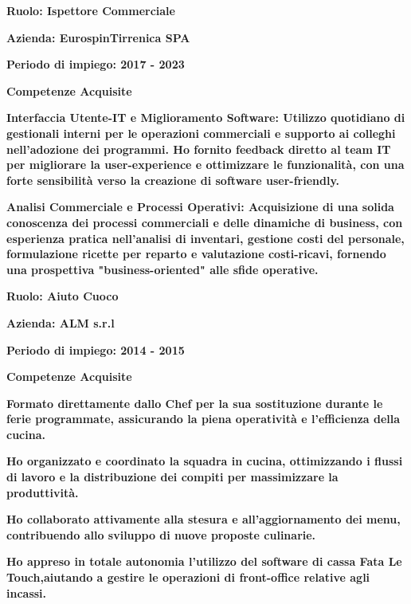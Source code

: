 \documentclass{article}
\newenvironment{listaIdentazione}[1]{
			\begin{list}{}{
			  \setlength{\leftmargin}{#1} %
			  \setlength{\itemsep}{0pt}	%
			  \setlength{\parskip}{0pt} %
			  \setlength{\parsep}{0pt} %
			  \setlength{\labelwidth}{0pt} %
			  \setlength{\labelsep}{0pt} %
			  \renewcommand{\makelabel}[1]{} %
			  }
			}{\end{list}}
\newcommand{\spaziocorto}{\\[0.1cm]}
\newcommand{\spaziolungo}{\\[0.3cm]}
\newcommand{\spaziopiulungo}{\\[0.8cm]}
\begin{document}
\begin{flushleft}
		\textbf{\normalsize{Ruolo: Ispettore Commerciale}}
			\spaziocorto
			\begin{listaIdentazione}{0.5cm}
			\item {\textbf{\normalsize{Azienda: EurospinTirrenica SPA }}}
			\spaziocorto
			\item {\textbf{\normalsize{Periodo di impiego: 2017 - 2023}}}
			\spaziocorto
			\item {\textbf{\normalsize{Competenze Acquisite}}}
			\spaziolungo
			\item {\textbf{\normalsize{Interfaccia Utente-IT e Miglioramento Software:
			Utilizzo quotidiano di gestionali interni per le operazioni commerciali e
			supporto ai colleghi nell'adozione dei programmi. Ho fornito feedback diretto
			al team IT per migliorare la user-experience e ottimizzare le funzionalità,
			con una forte sensibilità verso la creazione di software user-friendly.}}}
			\spaziolungo
			\item {\textbf{\normalsize{Analisi Commerciale e Processi Operativi: Acquisizione
			di una solida conoscenza dei processi commerciali e delle dinamiche di
			business, con esperienza pratica nell'analisi di inventari, gestione costi
			del personale, formulazione ricette per reparto e valutazione costi-ricavi,
			fornendo una prospettiva "business-oriented" alle sfide operative.}}}
			\spaziopiulungo
			\end{listaIdentazione}
			
		\textbf{\normalsize{Ruolo: Aiuto Cuoco }}
			\spaziocorto
			\begin{listaIdentazione}{0.5cm}
			\item {\textbf{\normalsize{Azienda: ALM s.r.l }}}
			\spaziocorto
			\item {\textbf{\normalsize{Periodo di impiego: 2014 - 2015}}}
			\spaziocorto
			\item {\textbf{\normalsize{Competenze Acquisite}}}
			\spaziolungo
			\item {\textbf{\normalsize{Formato direttamente dallo Chef per la sua sostituzione durante le ferie programmate, assicurando la piena operatività e l'efficienza della cucina.}}}
			\spaziolungo
    		\item {\textbf{\normalsize{Ho organizzato e coordinato la squadra in cucina, ottimizzando i flussi di lavoro e la distribuzione dei compiti per massimizzare la produttività.}}}
    		\spaziolungo
    		\item {\textbf{\normalsize{Ho collaborato attivamente alla stesura e all'aggiornamento dei menu, contribuendo allo sviluppo di nuove proposte culinarie.}}}
    		\spaziolungo
    		\item {\textbf{\normalsize{Ho appreso in totale autonomia l'utilizzo del software di cassa \textbf{Fata Le Touch},aiutando a gestire le operazioni di front-office relative agli incassi.}}}
    		\spaziopiulungo
			\end{listaIdentazione}
			

\end{flushleft}
\end{document}
